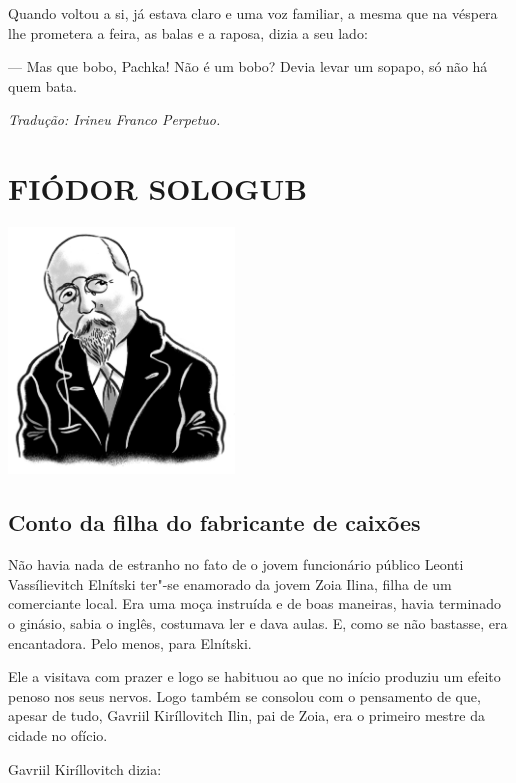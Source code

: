 Quando voltou a si, já estava claro e uma voz familiar, a mesma que na
véspera lhe prometera a feira, as balas e a raposa, dizia a seu lado:

--- Mas que bobo, Pachka! Não é um bobo? Devia levar um sopapo, só não
há quem bata.

\medskip

{\footnotesize\hfill\emph{Tradução: Irineu Franco Perpetuo.}}


\part[FIÓDOR SOLOGUB]{FIÓDOR SOLOGUB }

\pagebreak
\thispagestyle{empty}
\mbox{}
\vfill
\begin{center}
\includegraphics[width=6cm]{./imgs/autor7.jpg}
\end{center}


\chapter{Conto da filha do fabricante de caixões} \label{part8}

Não havia nada de estranho no fato de o jovem funcionário público Leonti
Vassílievitch Elnítski ter"-se enamorado da jovem Zoia Ilina, filha de um
comerciante local. Era uma moça instruída e de boas maneiras, havia
terminado o ginásio, sabia o inglês, costumava ler e dava aulas. E, como
se não bastasse, era encantadora. Pelo menos, para Elnítski.

Ele a visitava com prazer e logo se habituou ao que no início produziu
um efeito penoso nos seus nervos. Logo também se consolou com o
pensamento de que, apesar de tudo, Gavriil Kiríllovitch Ilin, pai de
Zoia, era o primeiro mestre da cidade no ofício.

Gavriil Kiríllovitch dizia:

